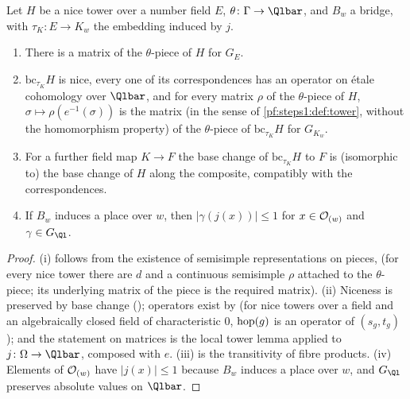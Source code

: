 \begin{lemma}\label{pf:steps1:localmat}
Let $H$ be a nice tower over a number field $E$, $\theta\colon\Gamma\to\Qlbar$, and $B_w$ a bridge, with $\tau_K\colon E\to
K_w$ the embedding induced by $j$.
\begin{enumerate}[label=\textup{(\roman*)},nosep]
\item There is a matrix of the $\theta$-piece of $H$ for $G_E$.
\item $\mathrm{bc}_{\tau_K}H$ is nice, every one of its correspondences has an operator on \'etale cohomology over $\Qlbar$, and
  for every matrix $\rho$ of the $\theta$-piece of $H$, $\sigma\mapsto\rho(e^{-1}(\sigma))$ is the matrix (in the sense of
  \cref{pf:steps1:def:tower}, without the homomorphism property) of the $\theta$-piece of $\mathrm{bc}_{\tau_K}H$ for $G_{K_w}$.
\item For a further field map $K\to F$ the base change of $\mathrm{bc}_{\tau_K}H$ to $F$ is (isomorphic to) the base change of $H$
  along the composite, compatibly with the correspondences.
\item If $B_w$ induces a place over $w$, then $|\gamma(j(x))|\le1$ for $x\in\mathcal{O}_{(w)}$ and $\gamma\in G_{\Ql}$.
\end{enumerate}
 
 
\end{lemma}

\begin{proof}
(i) follows from the existence of semisimple representations on pieces,
 (for every nice tower there are $d$ and a continuous semisimple $\rho$ attached
to the $\theta$-piece; its underlying matrix of the piece is the required matrix). (ii) Niceness is preserved by base change
(); operators exist by  (for nice towers
over a field and an algebraically closed field of characteristic $0$, $\mathrm{hop}(g)$ is an operator of $(s_g,t_g)$); and the
statement on matrices is the local tower lemma  applied to $j\colon\Omega\to\Qlbar$,
composed with $e$. (iii) is the transitivity of fibre products. (iv) Elements of $\mathcal{O}_{(w)}$ have $|j(x)|\le1$ because $B_w$
induces a place over $w$, and $G_{\Ql}$ preserves absolute values on $\Qlbar$.
\end{proof}

